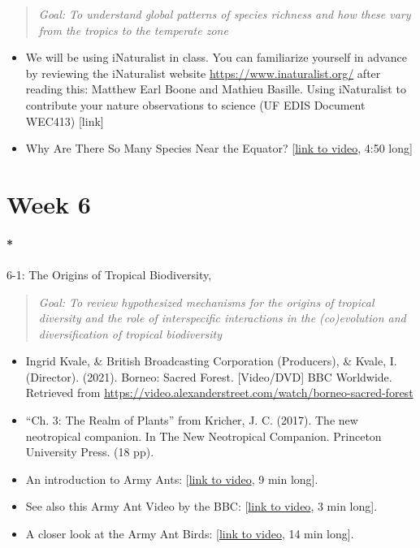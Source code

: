 \documentclass[
  10pt,
  letterpaper,
  oneside,
  open=any]{scrbook}
\let\oldparagraph\paragraph
\renewcommand{\paragraph}[1]{\oldparagraph{#1}\mbox{}}
\begin{document}
\begin{quote}
\emph{Goal: To understand global patterns of species richness and how
these vary from the tropics to the temperate zone}
\end{quote}

\begin{itemize}
\item
  We will be using iNaturalist in class. You can familiarize yourself in
  advance by reviewing the iNaturalist website
  \url{https://www.inaturalist.org/} after reading this: Matthew Earl
  Boone and Mathieu Basille. Using iNaturalist to contribute your nature
  observations to science (UF EDIS Document WEC413) {[}link{]}
\item
  Why Are There So Many Species Near the Equator?
  {[}\href{https://www.youtube.com/watch?v=IrbKix96_k0}{link to video},
  4:50 long{]}
\end{itemize}

\section*{Week 6}\label{week-6}


\paragraph*{6-1: The Origins of Tropical
Biodiversity,}\label{the-origins-of-tropical-biodiversity}

\begin{quote}
\emph{Goal: To review hypothesized mechanisms for the origins of
tropical diversity and the role of interspecific interactions in the
(co)evolution and diversification of tropical biodiversity}
\end{quote}

\begin{itemize}
\item
  Ingrid Kvale, \& British Broadcasting Corporation (Producers), \&
  Kvale, I. (Director). (2021). Borneo: Sacred Forest. {[}Video/DVD{]}
  BBC Worldwide. Retrieved from
  \url{https://video.alexanderstreet.com/watch/borneo-sacred-forest}
\item
  ``Ch. 3: The Realm of Plants'' from Kricher, J. C. (2017). The new
  neotropical companion. In The New Neotropical Companion. Princeton
  University Press. (18 pp).
\item
  An introduction to Army Ants:
  {[}\href{https://www.youtube.com/watch?v=p16g5IVCdeE}{link to video},
  9 min long{]}.
\item
  See also this Army Ant Video by the BBC:
  {[}\href{https://www.youtube.com/watch?v=JsfiUR0ZzLw}{link to video},
  3 min long{]}.
\item
  A closer look at the Army Ant Birds:
  {[}\href{https://www.youtube.com/watch?v=SQPcIYV_vKM}{link to video},
  14 min long{]}.
\end{itemize}
\end{document}
